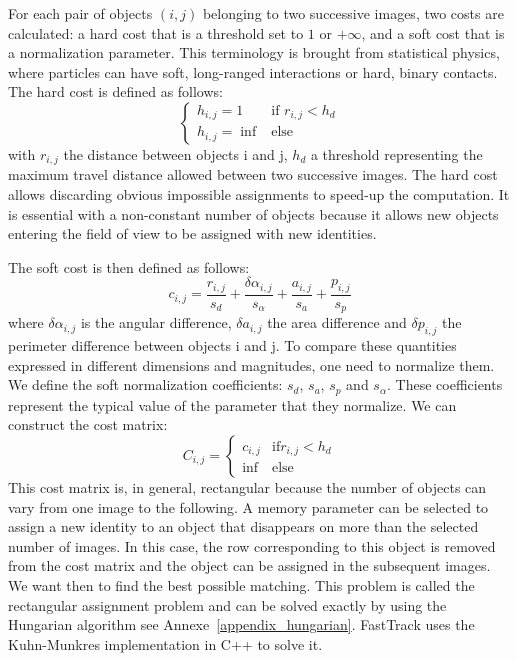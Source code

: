     For each pair of objects $(i,j)$ belonging to two successive images, two costs are calculated: a hard cost that is a threshold set to $1$ or $+ \infty$, and a soft cost that is a normalization parameter. This terminology is brought from statistical physics, where particles can have soft, long-ranged interactions or hard, binary contacts.
    The hard cost is defined as follows:
    \begin{equation}
        \left\{
            \begin{array}{ll}
                h_{i,j} = 1 & \mbox{if } r_{i,j} < h_{d} \\
                h_{i,j} = \inf & \mbox{else }
            \end{array}
        \right.
    \end{equation}
    \noindent with $r_{i,j}$ the distance between objects i and j, $h_{d}$ a threshold representing the maximum travel distance allowed between two successive images. The hard cost allows discarding obvious impossible assignments to speed-up the computation. It is essential with a non-constant number of objects because it allows new objects entering the field of view to be assigned with new identities.

    The soft cost is then defined as follows:
    \begin{equation}
        c_{i,j} = \frac{r_{i,j}}{s_d} + \frac{\delta\alpha_{i,j}}{s_{\alpha}} + \frac{a_{i,j}}{s_a} + \frac{p_{i,j}}{s_p}
    \end{equation}
    \noindent where $\delta\alpha_{i,j}$ is the angular difference, $\delta a_{i,j}$ the area difference and $\delta p_{i,j}$ the perimeter difference between objects i and j. To compare these quantities expressed in different dimensions and magnitudes, one need to normalize them. We define the soft normalization coefficients: $s_{d}$, $s_{a}$, $s_{p}$ and $s_{\alpha}$. These coefficients represent the typical value of the parameter that they normalize.
    We can construct the cost matrix:
    \begin{equation}
        C_{i,j} = \left\{
            \begin{array}{ll}
                c_{i,j} & \mbox{if} r_{i,j} < h_{d} \\
                \inf & \mbox{else}
            \end{array}
        \right.
    \end{equation}
    This cost matrix is, in general, rectangular because the number of objects can vary from one image to the following. A memory parameter can be selected to assign a new identity to an object that disappears on more than the selected number of images. In this case, the row corresponding to this object is removed from the cost matrix and the object can be assigned in the subsequent images.
    We want then to find the best possible matching. This problem is called the rectangular assignment problem and can be solved exactly by using the Hungarian algorithm see Annexe~\ref{appendix_hungarian}. FastTrack uses the Kuhn-Munkres implementation in C++ to solve it.

